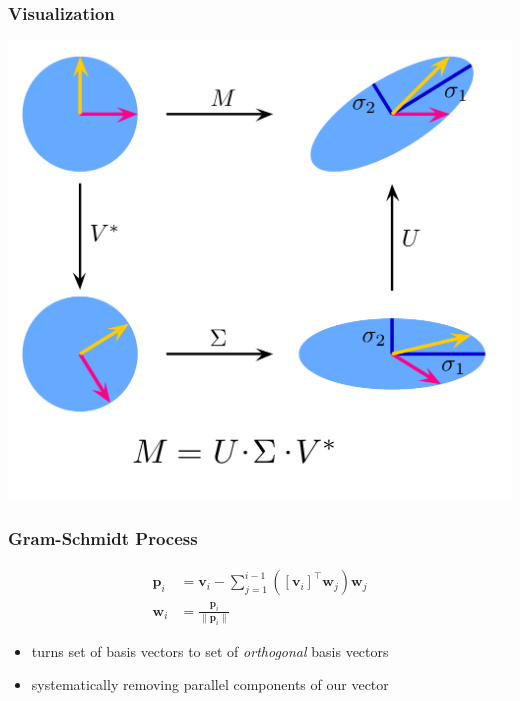 \documentclass[aspectratio=169]{beamer}
\newcommand{\tpose}[1]{\left[#1\right]^{\! \top} \!\!}
\begin{document}
\begin{frame}
    \frametitle{Visualization}

    \begin{center}
        \includegraphics[height=0.9\textheight]{1024px-Singular-Value-Decomposition.svg.png}
    \end{center}
\end{frame}

\begin{frame}
    \frametitle{Gram-Schmidt Process}

    \begin{align}
        \bm{p}_i &= \bm{v}_i - \sum_{j = 1}^{i - 1} (\tpose{\bm{v}_i} \bm{w}_j) \bm{w}_j \\
        \bm{w}_i &= \frac{\bm{p}_i}{\|\bm{p}_i\|}
    \end{align}

    \begin{itemize}
        \item turns set of basis vectors to set of \emph{orthogonal} basis vectors
        \item systematically removing parallel components of our vector
    \end{itemize}
\end{frame}
\end{document}

